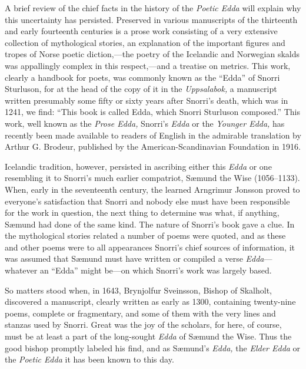 \documentclass{scrbook}
\newcommand{\mdash}{---}
\newcommand{\ndash}{--}
\newcommand{\commamdash}{---} %
\begin{document}
A brief review of the chief facts in the history of the \emph{Poetic Edda} will explain why this uncertainty has persisted. Preserved in various manuscripts of the thirteenth and early fourteenth centuries is a prose work consisting of a very extensive collection of mythological stories, an explanation of the important figures and tropes of Norse poetic diction,{\commamdash}the poetry of the Icelandic and Norwegian skalds was appallingly complex in this respect,{\commamdash}and a treatise on metrics. This work, clearly a handbook for poets, was commonly known as the ``Edda'' of Snorri Sturluson, for at the head of the copy of it in the \emph{Uppsalabok,} a manuscript written presumably some fifty or sixty years after Snorri's death, which was in 1241, we find: ``This book is called Edda, which Snorri Sturluson composed.'' This work, well known as the \emph{Prose Edda,} Snorri's \emph{Edda} or the \emph{Younger Edda,} has recently been made available to readers of English in the admirable translation by Arthur G. Brodeur, published by the American-Scandinavian Foundation in 1916.

Icelandic tradition, however, persisted in ascribing either this \emph{Edda} or one resembling it to Snorri's much earlier compatriot, Sæmund the Wise (1056\ndash1133). When, early in the seventeenth century, the learned Arngrimur Jonsson proved to everyone's satisfaction that Snorri and nobody else must have been responsible for the work in question, the next thing to determine was what, if anything, Sæmund had done of the same kind. The nature of Snorri's book gave a clue. In the mythological stories related a number of poems were quoted, and as these and other poems were to all appearances Snorri's chief sources of information, it was assumed that Sæmund must have written or compiled a verse \emph{Edda}{\mdash}whatever an ``Edda'' might be{\mdash}on which Snorri's work was largely based.

So matters stood when, in 1643, Brynjolfur Sveinsson, Bishop of Skalholt, discovered a manuscript, clearly written as early as 1300, containing twenty-nine poems, complete or fragmentary, and some of them with the very lines and stanzas used by Snorri. Great was the joy of the scholars, for here, of course, must be at least a part of the long-sought \emph{Edda} of Sæmund the Wise. Thus the good bishop promptly labeled his find, and as Sæmund's \emph{Edda,} the \emph{Elder Edda} or the \emph{Poetic Edda} it has been known to this day.
\end{document}
